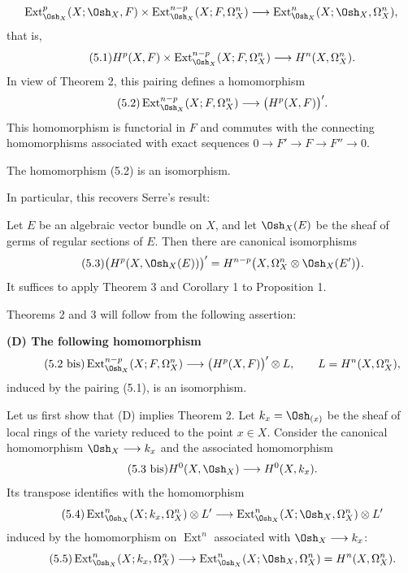 \[
\operatorname{Ext}_{\Osh_X}^{p}(X;\Osh_X,F)
\times\operatorname{Ext}_{\Osh_X}^{n-p}(X;F,\Omega_X^{n})
\longrightarrow
\operatorname{Ext}_{\Osh_X}^{n}(X;\Osh_X,\Omega_X^{n}),
\]
that is,
\begin{equation}\tag{5.1}
  H^{p}(X,F)
  \times\operatorname{Ext}_{\Osh_X}^{n-p}(X;F,\Omega_X^{n})
  \longrightarrow H^{n}(X,\Omega_X^{n}).
\end{equation}
In view of Theorem 2, this pairing defines a homomorphism
\begin{equation}\tag{5.2}
  \operatorname{Ext}_{\Osh_X}^{n-p}(X;F,\Omega_X^{n})
  \longrightarrow\bigl(H^{p}(X,F)\bigr)'.
\end{equation}
This homomorphism is functorial in $F$ and commutes with the connecting
homomorphisms associated with exact sequences
$0\longrightarrow F'\longrightarrow F\longrightarrow F''\longrightarrow0$.

 The homomorphism (5.2) is an isomorphism.

In particular, this recovers Serre's result:

 Let $E$ be an algebraic vector bundle on $X$, and let
$\Osh_X(E)$ be the sheaf of germs of regular sections of $E$. Then there are
canonical isomorphisms
\begin{equation}\tag{5.3}
  \bigl(H^{p}(X,\Osh_X(E))\bigr)'
  =H^{n-p}\bigl(X,\Omega_X^{n}\otimes\Osh_X(E')\bigr).
\end{equation}
It suffices to apply Theorem 3 and Corollary 1 to Proposition 1.

Theorems 2 and 3 will follow from the following assertion:

\noindent\textbf{(D) The following homomorphism}
\begin{equation}\tag{5.2 bis}
  \operatorname{Ext}_{\Osh_X}^{n-p}(X;F,\Omega_X^{n})
  \longrightarrow\bigl(H^{p}(X,F)\bigr)'\otimes L,
  \qquad L=H^{n}(X,\Omega_X^{n}),
\end{equation}
induced by the pairing (5.1), is an isomorphism.

Let us first show that (D) implies Theorem 2. Let $k_x=\Osh_{(x)}$ be the sheaf
of local rings of the variety reduced to the point $x\in X$. Consider the
canonical homomorphism $\Osh_X\longrightarrow k_x$ and the associated
homomorphism
\begin{equation}\tag{5.3 bis}
  H^{0}(X,\Osh_X)\longrightarrow H^{0}(X,k_x).
\end{equation}
Its transpose identifies with the homomorphism
\begin{equation}\tag{5.4}
  \operatorname{Ext}_{\Osh_X}^{n}(X;k_x,\Omega_X^{n})\otimes L'
  \longrightarrow
  \operatorname{Ext}_{\Osh_X}^{n}(X;\Osh_X,\Omega_X^{n})\otimes L'
\end{equation}
induced by the homomorphism on $\operatorname{Ext}^{n}$ associated with
$\Osh_X\longrightarrow k_x$:
\begin{equation}\tag{5.5}
  \operatorname{Ext}_{\Osh_X}^{n}(X;k_x,\Omega_X^{n})
  \longrightarrow
  \operatorname{Ext}_{\Osh_X}^{n}(X;\Osh_X,\Omega_X^{n})
  =H^{n}(X,\Omega_X^{n}).
\end{equation}

